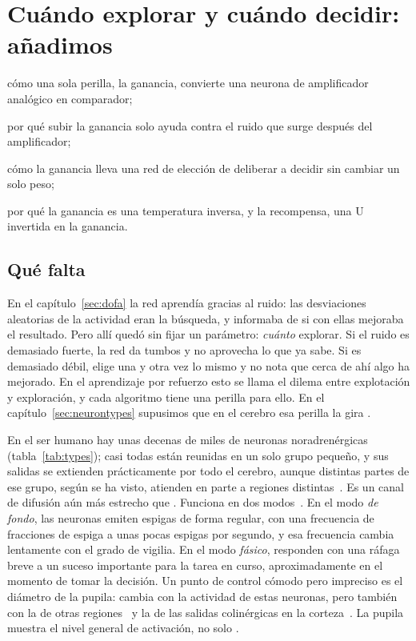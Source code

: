 \chapter{Cuándo explorar y cuándo decidir: añadimos }
\label{sec:nora}
\begin{chaptergoals}
\item cómo una sola perilla, la ganancia, convierte una neurona de amplificador analógico en comparador;
\item por qué subir la ganancia solo ayuda contra el ruido que surge después del amplificador;
\item cómo la ganancia lleva una red de elección de deliberar a decidir sin cambiar un solo peso;
\item por qué la ganancia es una temperatura inversa, y la recompensa, una U invertida en la ganancia.
\end{chaptergoals}

\section{Qué falta}

En el capítulo~\ref{sec:dofa} la red aprendía gracias al ruido: las desviaciones aleatorias de la actividad eran la búsqueda, y  informaba de si con ellas mejoraba el resultado. Pero allí quedó sin fijar un parámetro: \emph{cuánto} explorar. Si el ruido es demasiado fuerte, la red da tumbos y no aprovecha lo que ya sabe. Si es demasiado débil, elige una y otra vez lo mismo y no nota que cerca de ahí algo ha mejorado. En el aprendizaje por refuerzo esto se llama el dilema entre explotación y exploración, y cada algoritmo tiene una perilla para ello. En el capítulo~\ref{sec:neurontypes} supusimos que en el cerebro esa perilla la gira .

En el ser humano hay unas decenas de miles de neuronas noradrenérgicas (tabla~\ref{tab:types}); casi todas están reunidas en un solo grupo pequeño, y sus salidas se extienden prácticamente por todo el cerebro, aunque distintas partes de ese grupo, según se ha visto, atienden en parte a regiones distintas~\cite{Poe2020}. Es un canal de difusión aún más estrecho que . Funciona en dos modos~\cite{AstonJones2005}. En el modo \emph{de fondo}, las neuronas emiten espigas de forma regular, con una frecuencia de fracciones de espiga a unas pocas espigas por segundo, y esa frecuencia cambia lentamente con el grado de vigilia. En el modo \emph{fásico}, responden con una ráfaga breve a un suceso importante para la tarea en curso, aproximadamente en el momento de tomar la decisión. Un punto de control cómodo pero impreciso es el diámetro de la pupila: cambia con la actividad de estas neuronas, pero también con la de otras regiones~\cite{Joshi2016} y la de las salidas colinérgicas en la corteza~\cite{Reimer2016}. La pupila muestra el nivel general de activación, no solo .

